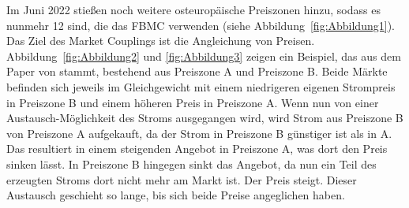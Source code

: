 Im Juni 2022 stießen noch weitere osteuropäische Preiszonen hinzu, sodass es nunmehr 12 sind, die das FBMC verwenden (siehe Abbildung~\ref{fig:Abbildung1}).\\
Das Ziel des Market Couplings ist die Angleichung von Preisen. Abbildung~\ref{fig:Abbildung2} und \ref{fig:Abbildung3} zeigen ein Beispiel, das aus dem Paper von \cite{3} stammt, bestehend aus Preiszone A und Preiszone B. Beide Märkte befinden sich jeweils im Gleichgewicht mit einem niedrigeren eigenen Strompreis in Preiszone B und einem höheren  Preis in Preiszone A. Wenn nun von einer Austausch-Möglichkeit des Stroms ausgegangen wird, wird Strom aus Preiszone B von Preiszone A aufgekauft, da der Strom in Preiszone B günstiger ist als in A. Das resultiert in einem steigenden Angebot in Preiszone A, was dort den Preis sinken lässt. In Preiszone B hingegen sinkt das Angebot, da nun ein Teil des erzeugten Stroms dort nicht mehr am Markt ist. Der Preis steigt. Dieser Austausch geschieht so lange, bis sich beide Preise angeglichen haben. 

